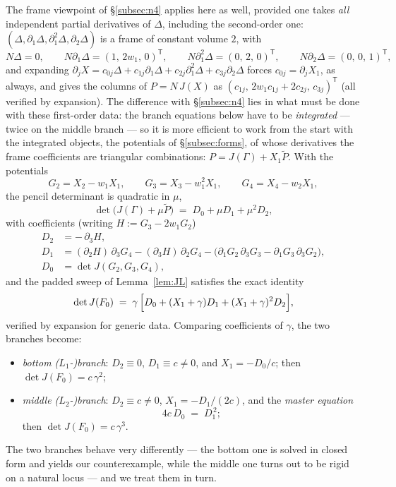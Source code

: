 \documentclass[11pt]{article}
\numberwithin{equation}{section}
\theoremstyle{plain}
\theoremstyle{definition}
\theoremstyle{remark}
\begin{document}
The frame viewpoint of \S\ref{subsec:n4} applies here as well, provided one
takes \emph{all} independent partial derivatives of $\Delta$, including the
second-order one: $(\Delta,\partial_1\Delta,\partial_1^2\Delta,\partial_2\Delta)$
is a frame of constant volume $2$, with
\[
N\Delta=0,\qquad
N\partial_1\Delta=(1,\,2w_1,\,0)^{\mathsf T},\qquad
N\partial_1^2\Delta=(0,\,2,\,0)^{\mathsf T},\qquad
N\partial_2\Delta=(0,\,0,\,1)^{\mathsf T},
\]
and expanding
$\partial_jX=c_{0j}\Delta+c_{1j}\partial_1\Delta+c_{2j}\partial_1^2\Delta
+c_{3j}\partial_2\Delta$ forces $c_{0j}=\partial_jX_1$, as always, and gives
the columns of $P=N\,J(X)$ as $(c_{1j},\,2w_1c_{1j}+2c_{2j},\,c_{3j})^{\mathsf T}$
(all verified by expansion). The difference with \S\ref{subsec:n4} lies in
what must be done with these first-order data: the branch equations below have
to be \emph{integrated} --- twice on the middle branch --- so it is more
efficient to work from the start with the integrated objects, the potentials
of \S\ref{subsec:forms}, of whose derivatives the frame coefficients are
triangular combinations: $P=J(\Gamma)+X_1\widetilde P$. With the potentials
\[
G_2=X_2-w_1X_1,\qquad G_3=X_3-w_1^2X_1,\qquad G_4=X_4-w_2X_1 ,
\]
the pencil determinant is quadratic in $\mu$,
\[
\det\bigl(J(\Gamma)+\mu\widetilde P\bigr)\;=\;D_0+\mu D_1+\mu^2D_2 ,
\]
with coefficients (writing $H:=G_3-2w_1G_2$)
\begin{align*}
D_2&=-\,\partial_3H,\\
D_1&=(\partial_2H)\,\partial_3G_4-(\partial_3H)\,\partial_2G_4
-\bigl(\partial_1G_2\,\partial_3G_3-\partial_1G_3\,\partial_3G_2\bigr),\\
D_0&=\det J(G_2,G_3,G_4),
\end{align*}
and the padded sweep of Lemma~\ref{lem:JL} satisfies the exact identity
\begin{equation}\label{eq:pencil5}
\det J(F_0)\;=\;\gamma\,\Bigl[D_0+(X_1+\gamma)D_1+(X_1+\gamma)^2D_2\Bigr],
\end{equation}
verified by expansion for generic data. Comparing coefficients of $\gamma$,
the two branches become:
\begin{itemize}
\item \emph{bottom ($L_1$-)branch}: $D_2\equiv0$, $D_1\equiv c\neq0$, and
$X_1=-D_0/c$; then $\det J(F_0)=c\,\gamma^2$;
\item \emph{middle ($L_2$-)branch}: $D_2\equiv c\neq0$, $X_1=-D_1/(2c)$, and
the \emph{master equation}
\begin{equation}\label{eq:master5}
4c\,D_0\;=\;D_1^{\,2} ;
\end{equation}
then $\det J(F_0)=c\,\gamma^3$.
\end{itemize}
The two branches behave very differently --- the bottom one is solved in
closed form and yields our counterexample, while the middle one turns out to
be rigid on a natural locus --- and we treat them in turn.
\end{document}
